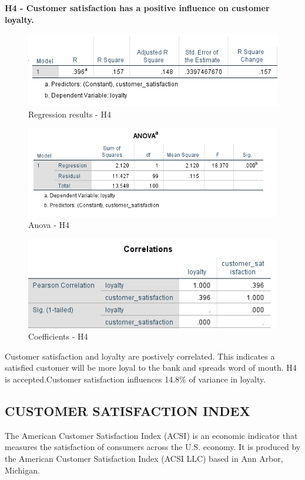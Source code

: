\documentclass[a4paper, 12pt]{extarticle}
\begin{document}
{\newpage
\par \textbf{H4 - Customer satisfaction has a positive influence on customer loyalty.}\\
\begin{figure}[H]
\centering
\includegraphics[scale=1]{customer_satisfaction_vs_loyalty.png}
\caption{Regression results - H4}
\end{figure}
\begin{figure}[H]
\centering
\includegraphics[scale=1]{anova_cs_lo.png}
\caption{Anova - H4}
\end{figure}

\begin{figure}[H]
\centering
\includegraphics[scale=1]{h4.png}
\caption{Coefficients - H4}
\end{figure}

Customer satisfaction and loyalty are postively correlated. This indicates a satisfied customer will be more loyal to the bank and spreads word of mouth. H4 is accepted.Customer satisfaction influences 14.8\% of variance in loyalty.

\newpage
\subsection{CUSTOMER SATISFACTION INDEX}
The American Customer Satisfaction Index (ACSI) is an economic indicator that measures the satisfaction of consumers across the U.S. economy. It is produced by the American Customer Satisfaction Index (ACSI LLC) based in Ann Arbor, Michigan.

}
\end{document}
